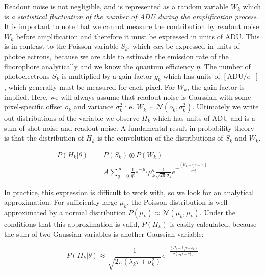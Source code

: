 \documentclass{ucetd}
\begin{document}
Readout noise is not negligible, and is represented as a random variable $W_{k}$ which is \textit{a statistical fluctuation of the number of ADU during the amplification process}. It is important to note that we cannot measure the contribution by readout noise $W_{k}$ before amplification and therefore it must be expressed in units of $\mathrm{ADU}$. This is in contrast to the Poisson variable $S_{k}$, which \emph{can} be expressed in units of photoelectrons, because we are able to estimate the emission rate of the fluorophore analytically and we know the quantum efficiency $\eta$. The number of photoelectrons $S_{k}$ is  multiplied by a gain factor $g_{k}$ which has units of $[\mathrm{ADU}/e^{-}]$, which generally must be measured for each pixel. For $W_{k}$, the gain factor is implied. Here, we will always assume that readout noise is Gaussian with some pixel-specific offset $o_{k}$ and variance $\sigma_{k}^{2}$ i.e. $W_{k} \sim \mathcal{N}(o_{k},\sigma_{k}^{2})$. Ultimately we write out distributions of the variable we observe $H_{k}$ which has units of $\mathrm{ADU}$ and is a sum of shot noise and readout noise. A fundamental result in probability theory is that the distribution of $H_{k}$ is the convolution of the distributions of $S_{k}$ and $W_{k}$,

\begin{align*}
P(H_{k}|\theta) &= P(S_{k})\circledast P(W_{k})\\
&= A\sum_{q=0}^{\infty} \frac{1}{q!}e^{-\mu_{k}}\mu_{k}^{q}\frac{1}{\sqrt{2\pi}\sigma_{k}}e^{-\frac{(H_{k}-g_{k}q-o_{k})}{2\sigma_{k}^{2}}}
\end{align*}

In practice, this expression is difficult to work with, so we look for an analytical approximation. For sufficiently large $\mu_{k}$, the Poisson distribution is well-approximated by a normal distribution $P(\mu_{k}) \approx \mathcal{N}(\mu_{k},\mu_{k})$. Under the conditions that this approximation is valid, $P(H_{k})$ is easily calculated, because the sum of two Gaussian variables is another Gaussian variable:

\begin{equation}
P(H_{k}|\theta) \approx \frac{1}{\sqrt{2\pi(\lambda_{k}\tau+\sigma_{k}^{2})}}e^{-\frac{(H_{k}-\lambda_{k}\tau-o_{k})}{2(\lambda_{k}\tau+\sigma_{k}^{2})}}
\end{equation}
\end{document}
